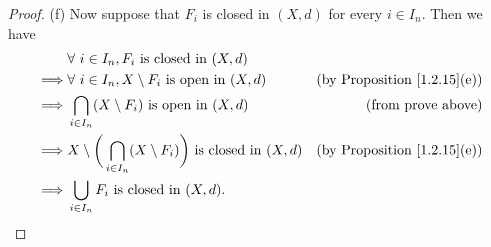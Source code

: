 \begin{proof}{(f)}
    Now suppose that \(F_i\) is closed in \((X, d)\) for every \(i \in I_n\).
    Then we have
    \begin{align*}
                 & \forall\ i \in I_n, F_i \text{ is closed in } (X, d)                                                                                 \\
        \implies & \forall\ i \in I_n, X \setminus F_i \text{ is open in } (X, d)                             & \text{(by Proposition \ref{1.2.15}(e))} \\
        \implies & \bigcap_{i \in I_n} (X \setminus F_i) \text{ is open in } (X, d)                           & \text{(from prove above)}               \\
        \implies & X \setminus \bigg(\bigcap_{i \in I_n} (X \setminus F_i)\bigg) \text{ is closed in } (X, d) & \text{(by Proposition \ref{1.2.15}(e))} \\
        \implies & \bigcup_{i \in I_n} F_i \text{ is closed in } (X, d).
    \end{align*}
\end{proof}

